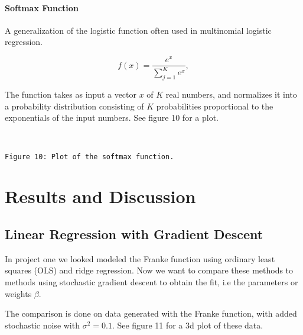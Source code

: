 \documentclass[11pt]{article}
\begin{document}
    \hypertarget{softmax-function}{%
\paragraph{Softmax Function}\label{softmax-function}}

A generalization of the logistic function often used in multinomial
logistic regression.

\[
f(x) = \frac{e^x}{\sum_{j=1}^K e^{x}},
\]

The function takes as input a vector \(x\) of \(K\) real numbers, and
normalizes it into a probability distribution consisting of \(K\)
probabilities proportional to the exponentials of the input numbers. See
figure 10 for a plot.

    \begin{center}
    \end{center}
    { \hspace*{\fill} \\}
    
    \begin{Verbatim}[commandchars=\\\{\}]
Figure 10: Plot of the softmax function.
    \end{Verbatim}

    \hypertarget{results-and-discussion}{%
\section{Results and Discussion}\label{results-and-discussion}}

\hypertarget{linear-regression-with-gradient-descent}{%
\subsection{Linear Regression with Gradient
Descent}\label{linear-regression-with-gradient-descent}}

In project one we looked modeled the Franke function using ordinary
least squares (OLS) and ridge regression. Now we want to compare these
methods to methods using stochastic gradient descent to obtain the fit,
i.e the parameters or weights \(\beta\).

The comparison is done on data generated with the Franke function, with
added stochastic noise with \(\sigma^2=0.1\). See figure 11 for a 3d
plot of these data.

    \begin{center}
    \end{center}
    { \hspace*{\fill} \\}
    
\end{document}
